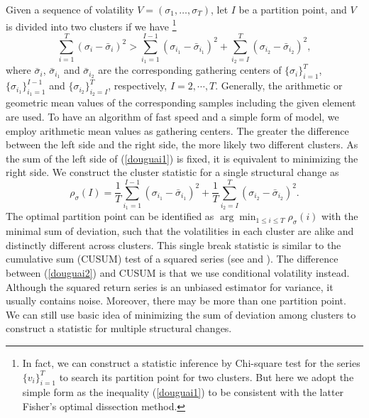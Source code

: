 \documentclass[preprint,12pt,authoryear]{elsarticle}
\begin{document}
Given a sequence of volatility $V=(\sigma_1,\dots,\sigma_T)$, let $I$ be a partition point, and $V$ is divided into two clusters if we have
\footnote{In fact, we can construct a statistic inference by Chi-square test for the series $\{v_i\}_{i=1}^T$ to search its partition point for two clusters. But here we adopt the simple form as the inequality (\ref{douguai1}) to be consistent with the latter Fisher's optimal dissection method.}
\begin{equation}\label{douguai1}
\sum_{i=1}^{T}( \sigma_i-\bar{\sigma}_i )^2 > \sum_{{i_1}=1}^{I-1}( \sigma_{i_1}-\bar{\sigma}_{i_1} )^2 + \sum_{{i_2}=I}^{T}( \sigma_{i_2}-\bar{\sigma}_{i_2} )^2, \end{equation}
where $\bar{\sigma}_i$, $\bar{\sigma}_{i_1}$ and $\bar{\sigma}_{i_2}$ are
the corresponding gathering centers of $\{\sigma_i\}_{i=1}^T$, $\{\sigma_{i_1}\}_{i_1=1}^{I-1}$ and $\{\sigma_{i_2}\}_{i_2=I}^{T}$, respectively, $I=2,\cdots,T$.
Generally, the arithmetic or geometric mean values of the corresponding samples including the given element are used.
To have an algorithm of fast speed and a simple form of model, we employ arithmetic mean values as gathering centers.
The greater the difference between the left side and
the right side, the more likely two different clusters.
As the sum of the left side of (\ref{douguai1}) is fixed, it is equivalent to minimizing the right side.
We construct the cluster statistic for a single structural change as
\begin{equation}\label{douguai2}
\rho_\sigma(I) =
\frac 1T\sum_{{i_1}=1}^{I-1}( \sigma_{i_1}-\bar{\sigma}_{i_1} )^2 +
\frac 1T\sum_{{i_2}=I}^{T}( \sigma_{i_2}-\bar{\sigma}_{i_2} )^2.
\end{equation}
The optimal partition point can be identified as ${\arg\min_{1\le i\le T}\rho_\sigma(i)}$ with the minimal sum of deviation, such that the volatilities in each cluster are alike and distinctly different across clusters.
This single break statistic is similar to the cumulative sum (CUSUM) test of a squared series (see \cite{Andreou2002} and \cite{Xu2013}). The difference between (\ref{douguai2}) and CUSUM is that we use conditional volatility instead. Although the squared return series is an unbiased estimator for variance, it usually contains noise.
Moreover, there may be more than one partition point. We can still use basic idea of minimizing the sum of deviation among clusters to construct a statistic for multiple structural changes.

\end{document}
